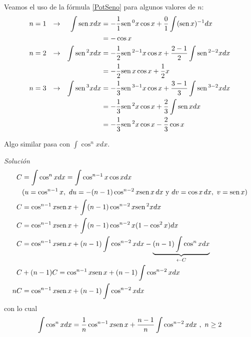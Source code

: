Veamos el uso de la fórmula \eqref{PotSeno} para algunos valores de $n$:
{\small
\begin{align*}
n&=1 &\rightarrow& &\int \text{\rm sen}\, xdx&=-\frac{1}{1}\text{\rm sen}\,^0x\cos x+\frac{0}{1}\int(\text{\rm sen}\, x)^{-1}dx\\
& & & & &=-\cos x\\
n&=2 &\rightarrow& &\int \text{\rm sen}\, ^{2}xdx&=-\frac{1}{2}\text{\rm sen}\, ^{2-1}x\cos x+\frac{2-1}{2}\int \text{\rm sen}\, ^{2-2}xdx\\
& & & & &=-\frac{1}{2}\text{\rm sen}\, x\cos x+\frac{1}{2}x\\
n&=3 &\rightarrow& &\int \text{\rm sen}\, ^{3}xdx&=-\frac{1}{3}\text{\rm sen}\, ^{3-1}x\cos x+
\frac{3-1}{3}\int \text{\rm sen}\, ^{3-2}xdx\\
& & & & & =-\frac{1}{3}\text{\rm sen}\,^{2}x\cos x+\frac{2}{3}\int \text{\rm sen}\, xdx\\
& & & & &=-\frac{1}{3}\text{\rm sen}\,^{2}x\cos x-\frac{2}{3}\cos x
\end{align*}
}

\begin{ejemplo}
\textnormal{Algo similar pasa con} $\displaystyle{\int \cos^{n}xdx}$.
\end{ejemplo}
\textit{Solución}
{\small
\begin{align*}
C&=\int \cos ^{n}xdx=\int \cos ^{n-1}x\cos xdx\\
& (u=\cos ^{n-1}x,\ du=-(n-1)\cos^{n-2}x\text{\rm sen}\, x\,dx\text{ y } dv=\cos x\, dx,\ v=\text{\rm sen}\, x)\\
C&=\cos ^{n-1}x\text{\rm sen}\, x+\int (n-1)\cos ^{n-2}x\text{\rm sen}\, ^{2}xdx\\
C&=\cos ^{n-1}x\text{\rm sen}\, x+\int (n-1)\cos ^{n-2}x(1-\cos ^{2}x)dx\\
C&=\cos ^{n-1}x\text{\rm sen}\, x+(n-1)\int \cos ^{n-2}xdx-\underbrace{(n-1)\int \cos ^{n}xdx}_{\leftarrow C}\\
C&+(n-1)C=\cos ^{n-1}x\text{\rm sen}\, x+(n-1)\int \cos ^{n-2}xdx\\
nC&=\cos ^{n-1}x\text{\rm sen}\, x+(n-1)\int \cos ^{n-2}xdx
\end{align*}
}
con lo cual
\begin{equation}\label{PotCoseno}
\int \cos^{n}xdx=\frac{1}{n}\cos ^{n-1}x\text{\rm sen}\, x +\frac{n-1}{n}\int \cos ^{n-2}xdx\ ,\ n\geq 2
\end{equation}

